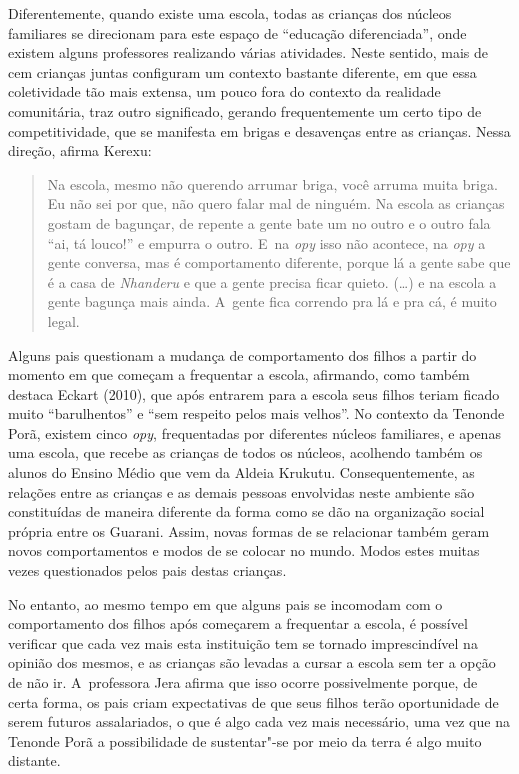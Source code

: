 Diferentemente, quando existe uma escola, todas as crianças dos núcleos
familiares se direcionam para este espaço de ``educação diferenciada'',
onde existem alguns professores realizando várias atividades. Neste
sentido, mais de cem crianças juntas configuram um contexto bastante
diferente, em que essa coletividade tão mais extensa, um pouco fora do
contexto da realidade comunitária, traz outro significado, gerando
frequentemente um certo tipo de competitividade, que se manifesta em
brigas e desavenças entre as crianças. Nessa direção, afirma Kerexu:

\begin{quote}
\noindent
Na escola, mesmo não querendo arrumar briga, você arruma muita briga. Eu
não sei por que, não quero falar mal de ninguém. Na escola as crianças
gostam de bagunçar, de repente a gente bate um no outro e o outro fala
``ai, tá louco!'' e empurra o outro. E~na \emph{opy} isso não acontece, na \emph{opy} a
gente conversa, mas é comportamento diferente, porque lá a gente sabe
que é a casa de \emph{Nhanderu} e que a gente precisa ficar quieto. (\ldots{}) e na
escola a gente bagunça mais ainda. A~gente fica correndo pra lá e pra
cá, é muito legal.
\end{quote}

Alguns pais questionam a mudança de comportamento dos filhos a partir do
momento em que começam a frequentar a escola, afirmando, como também
destaca Eckart (2010), que após entrarem para a escola seus filhos
teriam ficado muito ``barulhentos'' e ``sem respeito pelos mais velhos''.
No contexto da Tenonde Porã, existem cinco \emph{opy}, frequentadas por
diferentes núcleos familiares, e apenas uma escola, que recebe as
crianças de todos os núcleos, acolhendo também os alunos do Ensino
Médio que vem da Aldeia Krukutu. Consequentemente, as relações entre as
crianças e as demais pessoas envolvidas neste ambiente são constituídas
de maneira diferente da forma como se dão na organização social própria
entre os Guarani. Assim, novas formas de se relacionar também geram
novos comportamentos e modos de se colocar no mundo. Modos estes muitas
vezes questionados pelos pais destas crianças. 

No entanto, ao mesmo tempo em que alguns pais se incomodam com o
comportamento dos filhos após começarem a frequentar a escola, é
possível verificar que cada vez mais esta instituição tem se tornado
imprescindível na opinião dos mesmos, e as crianças são levadas a
cursar a escola sem ter a opção de não ir. A~professora Jera afirma que
isso ocorre possivelmente porque, de certa forma, os pais criam
expectativas de que seus filhos terão oportunidade de serem futuros
assalariados, o que é algo cada vez mais necessário, uma vez que na
Tenonde Porã a possibilidade de sustentar"-se por meio da terra é algo
muito distante.

